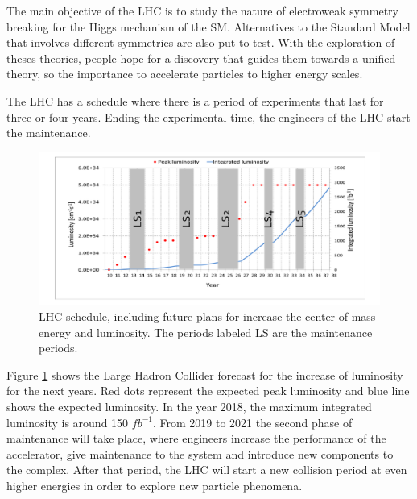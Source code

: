 The main objective of the LHC is to study the nature of electroweak symmetry breaking for the Higgs mechanism of the SM. 
Alternatives to the Standard Model that involves different symmetries are also put to test. With the exploration of theses theories, people hope for a discovery that guides them towards a unified theory, so the importance to accelerate particles to higher energy scales.

The LHC has a schedule where there is a period of experiments that last for three or four years. Ending the experimental time, the engineers of the LHC start the maintenance.

\begin{figure}[ht]
\centering
\includegraphics[scale=0.5]{Chapter2/lum6.png}
\caption[LHC schedule, including future plans for increasing the center of mass energy and luminosity. The periods labeled LS are the maintenance periods]{LHC schedule, including future plans for increase the center of mass energy and luminosity. The periods labeled LS are the maintenance periods\cite{cern3}.}
\label{lhc-lumi}
\end{figure}
Figure \ref{lhc-lumi} shows the Large Hadron Collider forecast for the increase of luminosity for the next years. Red dots represent the expected peak luminosity and blue line shows the expected luminosity. In the year 2018, the maximum integrated luminosity is around 150 $fb^{-1}$\cite{cern3}. From 2019 to 2021 the second phase of maintenance will take place, where engineers increase the performance of the accelerator, give maintenance to the system and introduce new components to the complex. After that period, the LHC will start a new collision period at even higher energies in order to explore new particle phenomena.

\pagebreak

